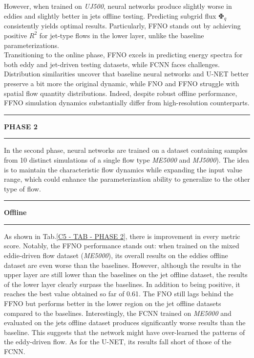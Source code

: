 However, when trained on \textit{UJ500}, neural networks produce slightly worse in eddies and slightly better in jets offline testing. Predicting subgrid flux $\mathbf{\Phi}_q$ consistently yields optimal results. Particularly, FFNO stands out by achieving positive $R^2$ for jet-type flows in the lower layer, unlike the baseline parameterizations.\\

Transitioning to the online phase, FFNO excels in predicting energy spectra for both eddy and jet-driven testing datasets, while FCNN faces challenges. Distribution similarities uncover that baseline neural networks and U-NET better preserve a bit more the original dynamic, while FNO and FFNO struggle with spatial flow quantity distributions. Indeed, despite robust offline performance, FFNO simulation dynamics substantially differ from high-resolution counterparts.



\newpage


%
%
\rule[0cm]{\linewidth}{0.075cm}
\begin{center}
\Large \textbf{PHASE 2}
\end{center}
\vspace{0.15cm}
\rule[0.3cm]{\linewidth}{0.075cm}

In the second phase, neural networks are trained on a dataset containing samples from 10 distinct simulations of a single flow type \textit{ME5000} and \textit{MJ5000}). The idea is to maintain the characteristic flow dynamics while expanding the input value range, which could enhance the parameterization ability to generalize to the other type of flow.\\

\rule[0cm]{\linewidth}{0.025cm}
\begin{center}
\small \textbf{Offline}
\end{center}
\rule[0.3cm]{\linewidth}{0.025cm}

As shown in Tab.\ref{C5 - TAB - PHASE 2}, there is improvement in every metric score. Notably, the FFNO performance stands out: when trained on the mixed eddie-driven flow dataset (\textit{ME5000}), its overall results on the eddies offline dataset are even worse than the baselines. However, although the results in the upper layer are still lower than the baselines on the jet offline dataset, the results of the lower layer clearly surpass the baselines. In addition to being positive, it reaches the best value obtained so far of 0.61. The FNO still lags behind the FFNO but performs better in the lower region on the jet offline datasets compared to the baselines. Interestingly, the FCNN trained on \textit{ME5000} and evaluated on the jets offline dataset produces significantly worse results than the baseline. This suggests that the network might have over-learned the patterns of the eddy-driven flow. As for the U-NET, its results fall short of those of the FCNN.


